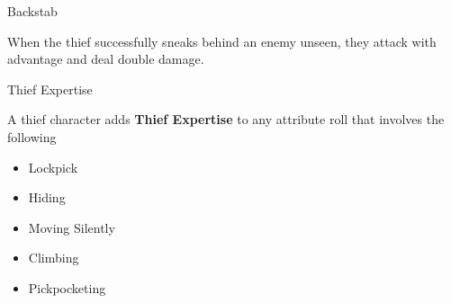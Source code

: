 \begin{multicols}{2} %

\begin{mercHeading}
Backstab 
\end{mercHeading}

When the thief successfully sneaks behind an enemy unseen, they attack with advantage and deal double damage.\\
\vfill\null
\columnbreak
\begin{mercHeading}
Thief Expertise
\end{mercHeading}

A thief character adds \textbf{Thief Expertise} to any attribute roll that involves the following
\begin{itemize}
	\setlength\itemsep{0em}
	\item Lockpick
	\item Hiding
	\item Moving Silently
	\item Climbing
	\item Pickpocketing
	
\end{itemize}

\end{multicols}

